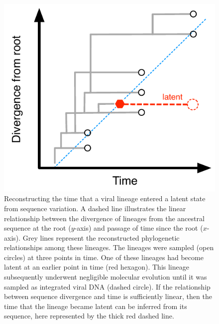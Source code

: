 \documentclass[12pt]{article}
\begin{document}
\begin{figure}[ht]
	\centering
	\includegraphics{figures/latency-scheme}
	\caption[Latency Scheme]{ 
	Reconstructing the time that a viral lineage entered a latent state from sequence variation.  
	A dashed line illustrates the linear relationship between the divergence of lineages from the ancestral sequence at the root ($y$-axis) and passage of time since the root ($x$-axis).
	Grey lines represent the reconstructed phylogenetic relationships among these lineages.
	The lineages were sampled (open circles) at three points in time.
	One of these lineages had become latent at an earlier point in time (red hexagon).
	This lineage subsequently underwent negligible molecular evolution until it was sampled as integrated viral DNA (dashed circle).
	If the relationship between sequence divergence and time is sufficiently linear, then the time that the lineage became latent can be inferred from its sequence, here represented by the thick red dashed line.
	}
	\label{fig:latenttree}
\end{figure}
\end{document}
